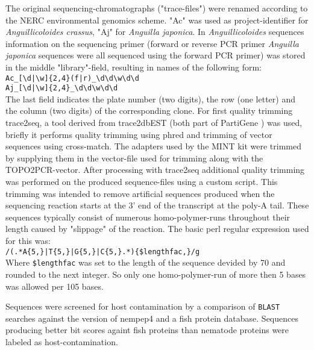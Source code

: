 The original sequencing-chromatographs ("trace-files") were renamed
according to the NERC environmental genomics scheme. "Ac" was used as
project-identifier for \textit{Anguillicoloides crassus}, "Aj" for
\textit{Anguilla japonica}. In \textit{Anguillicoloides} sequences
information on the sequencing primer (forward or reverse PCR primer
\textit{Anguilla japonica} sequences were all sequenced using the
forward PCR primer) was stored in the middle
"library"-field, resulting in names of the following form:\\

\texttt{Ac\_[\textbackslash{}d|\textbackslash{}w]\{2,4\}(f|r)\_\textbackslash{}d\textbackslash{}d\textbackslash{}w\textbackslash{}d\textbackslash{}d}\\
\texttt{Aj\_[\textbackslash{}d|\textbackslash{}w]\{2,4\}\_\textbackslash{}d\textbackslash{}d\textbackslash{}w\textbackslash{}d\textbackslash{}d}\\

The last field indicates the plate number (two digits), the row (one
letter) and the column (two digits) of the corresponding clone. For
first quality trimming trace2seq, a tool derived from trace2dbEST
(both part of PartiGene \cite{parkinson_partigene--constructing_2004})
was used, briefly it performs quality trimming using
phred\cite{ewing_base-calling_1998} and trimming of vector sequences
using cross-match\cite{PHRAP}. The adapters used by the MINT kit were
trimmed by supplying them in the vector-file used for trimming along
with the TOPO2PCR-vector. After processing with trace2seq additional
quality trimming was performed on the produced sequence-files using a
custom script. This trimming was intended to remove artificial
sequences produced when the sequencing reaction starts at the 3' end
of the transcript at the poly-A tail. These sequences typically
consist of numerous homo-polymer-runs throughout their length caused
by "slippage" of the reaction.
The basic perl regular expression used for this was:\\

\texttt{/(.*A\{5,\}|T\{5,\}|G\{5,\}|C\{5,\}.*)\{\$lengthfac,\}/g}\\

Where \texttt{\$lengthfac} was set to the length of the sequence
devided by 70 and rounded to the next integer. So only one
homo-polymer-run of more then 5 bases was allowed per 105 bases.

Sequences were screened for host contamination by a comparison of
\texttt{BLAST} searches against the version of nempep4 and a fish
protein database. Sequences producing better bit scores againt fish
proteins than nematode proteins were labeled as host-contamination.

